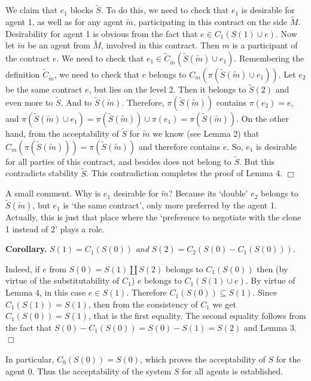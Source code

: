 \documentclass[12pt,a4paper]{article}
\begin{document}
We claim that $e_1$ blocks $\widetilde S$. To do this, we need to check that $e_1$ is desirable for agent 1, as well as for any agent $\widetilde m$, participating in this contract on the side $\widetilde M$. Desirability for agent 1 is obvious from the fact that $e\in C_1(S(1)\cup e)$. Now let $\widetilde m$ be an agent from $\widetilde M$, involved in this contract. Then $m$ is a participant of the contract $e$. We need to check that $e_1\in \widetilde C_{\widetilde m}(\widetilde S(\widetilde m)\cup e_1)$. Remembering the definition $\widetilde C_{\widetilde m}$, we need to check that $e$ belongs to $C_m(\pi(\widetilde S(\widetilde m)\cup e_1))$. Let $e_2$ be the same contract $e$, but lies on the level 2. Then it belongs to $\widetilde S(2)$ and even more to $\widetilde S$. And to $\widetilde S(\widetilde m)$. Therefore, $\pi (\widetilde S(\widetilde m))$ contains $\pi (e_2)=e$, and $\pi (\widetilde S(\widetilde m)\cup e_1)=\pi (\widetilde S(\widetilde m))\cup \pi (e_1)=\pi (\widetilde S(\widetilde m))$. On the other hand, from the acceptability of $\widetilde S$ for $\widetilde m$ we know (see Lemma 2) that $C_m(\pi(\widetilde S(\widetilde m)))=\pi (\widetilde S(\widetilde m))$ and therefore contains $e$. So, $e_1$ is desirable for all parties of this contract, and besides does not belong to $\widetilde S$. But this contradicts stability $\widetilde S$. This contradiction completes the proof of Lemma 4. $\Box$\medskip

A small comment. Why is $e_1$ desirable for $\widetilde m$? Because its `double' $e_2$ belongs to $\widetilde S(\widetilde m)$, but $e_1$ is `the same contract', only more preferred by the agent 1. Actually, this is just that place where the `preference to negotiate with the clone 1 instead of 2' plays a role.\medskip

\textbf{Corollary.} $S(1)=C_1(S(0))$ \emph{and} $S(2)=C_2(S(0)-C_1(S(0)))$. \medskip

Indeed, if $e$ from $S(0)=S(1)\coprod S(2)$ belongs to $C_1(S(0))$ then (by virtue of the substitutability of $C_1$) $e$ belongs to $C_1(S(1)\cup e)$. By virtue of Lemma 4, in this case $e\in S(1)$. Therefore $C_1(S(0))\subseteq S(1)$. Since $C_1(S(1))=S(1)$, then from the consistency of $C_1$ we get $C_1(S(0))=S(1)$, that is the first equality. The second equality follows from the fact that      $S(0)-C_1(S(0))=S(0)-S(1)=S(2)$ and Lemma 3. $\Box$\medskip

In particular, $C_0(S(0))=S(0)$, which proves the acceptability of $S$ for the agent 0. Thus the acceptability of the system $S$ for all agents is established.\medskip
\end{document}
